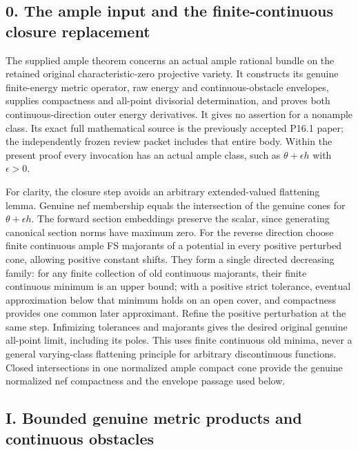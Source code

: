 \documentclass[
]{article}
\begin{document}
\subsection{0. The ample input and the finite-continuous closure
replacement}\label{the-ample-input-and-the-finite-continuous-closure-replacement}

The supplied ample theorem concerns an actual ample rational bundle on
the retained original characteristic-zero projective variety. It
constructs its genuine finite-energy metric operator, raw energy and
continuous-obstacle envelopes, supplies compactness and all-point
divisorial determination, and proves both continuous-direction outer
energy derivatives. It gives no assertion for a nonample class. Its
exact full mathematical source is the previously accepted P16.1 paper;
the independently frozen review packet includes that entire body. Within
the present proof every invocation has an actual ample class, such as
\(\theta+\epsilon h\) with \(\epsilon>0\).

For clarity, the closure step avoids an arbitrary extended-valued
flattening lemma. Genuine nef membership equals the intersection of the
genuine cones for \(\theta+\epsilon h\). The forward section embeddings
preserve the scalar, since generating canonical section norms have
maximum zero. For the reverse direction choose finite continuous ample
FS majorants of a potential in every positive perturbed cone, allowing
positive constant shifts. They form a single directed decreasing family:
for any finite collection of old continuous majorants, their finite
continuous minimum is an upper bound; with a positive strict tolerance,
eventual approximation below that minimum holds on an open cover, and
compactness provides one common later approximant. Refine the positive
perturbation at the same step. Infimizing tolerances and majorants gives
the desired original genuine all-point limit, including its poles. This
uses finite continuous old minima, never a general varying-class
flattening principle for arbitrary discontinuous functions. Closed
intersections in one normalized ample compact cone provide the genuine
normalized nef compactness and the envelope passage used below.

\subsection{I. Bounded genuine metric products and continuous
obstacles}\label{i.-bounded-genuine-metric-products-and-continuous-obstacles}
\end{document}
